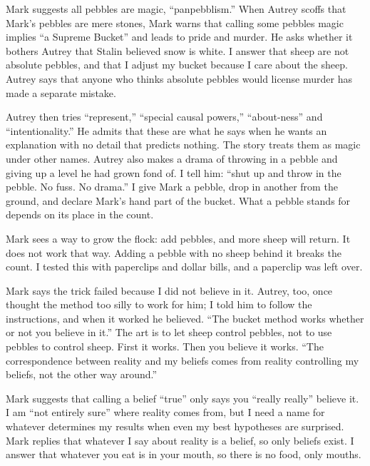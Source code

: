 Mark suggests all pebbles are magic, ``panpebblism.'' When Autrey scoffs that Mark's pebbles are mere stones, Mark warns that calling some pebbles magic implies ``a Supreme Bucket'' and leads to pride and murder. He asks whether it bothers Autrey that Stalin believed snow is white. I answer that sheep are not absolute pebbles, and that I adjust my bucket because I care about the sheep. Autrey says that anyone who thinks absolute pebbles would license murder has made a separate mistake.

Autrey then tries ``represent,'' ``special causal powers,'' ``about-ness'' and ``intentionality.'' He admits that these are what he says when he wants an explanation with no detail that predicts nothing. The story treats them as magic under other names. Autrey also makes a drama of throwing in a pebble and giving up a level he had grown fond of. I tell him: ``shut up and throw in the pebble. No fuss. No drama.'' I give Mark a pebble, drop in another from the ground, and declare Mark's hand part of the bucket. What a pebble stands for depends on its place in the count. 

Mark sees a way to grow the flock: add pebbles, and more sheep will return. It does not work that way. Adding a pebble with no sheep behind it breaks the count. I tested this with paperclips and dollar bills, and a paperclip was left over.

Mark says the trick failed because I did not believe in it. Autrey, too, once thought the method too silly to work for him; I told him to follow the instructions, and when it worked he believed. ``The bucket method works whether or not you believe in it.'' The art is to let sheep control pebbles, not to use pebbles to control sheep. First it works. Then you believe it works. ``The correspondence between reality and my beliefs comes from reality controlling my beliefs, not the other way around.'' 

Mark suggests that calling a belief ``true'' only says you ``really really'' believe it. I am ``not entirely sure'' where reality comes from, but I need a name for whatever determines my results when even my best hypotheses are surprised.  Mark replies that whatever I say about reality is a belief, so only beliefs exist. I answer that whatever you eat is in your mouth, so there is no food, only mouths. 

